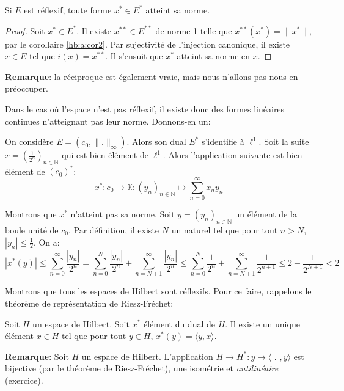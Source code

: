 \begin{prop}
  Si $E$ est réflexif, toute forme $x^*\in E^*$ atteint
  sa norme.
\end{prop}

\begin{proof}
  Soit $x^*\in E^*$. Il existe $x^{**}\in E^{**}$ de
  norme 1
  telle que $x^{**}(x^*)=\|x^*\|$, par le corollaire
  \ref{hb:a:cor2}. Par sujectivité de l'injection
  canonique, il existe $x\in E$ tel que $i(x)=x^{**}$.
  Il s'ensuit que $x^*$ atteint sa norme en $x$.
\end{proof}

\textbf{Remarque}: la réciproque est également vraie,
mais nous n'allons pas nous en préoccuper.

Dans le cas où l'espace n'est pas réflexif, il
existe donc des formes linéaires continues n'atteignant
pas leur norme. Donnons-en un:
\begin{ex}
  On considère $E = (c_0, \|.\|_\infty)$. Alors
  son dual $E^*$ s'identifie à $\ell^1$. Soit
  la suite $x = (\frac{1}{2^n})_{n\in \mathbb{N}}$
  qui est bien élément de $\ell^1$. Alors
  l'application suivante est bien élément de $(c_0)^*$:
  $$x^*:c_0\to\mathbb{K}:(y_n)_{n\in\mathbb{N}}\mapsto \sum_{n=0}^\infty x_ny_n$$

  Montrons que $x^*$ n'atteint pas sa norme. Soit $y = (y_n)_{n\in\mathbb{N}}$
  un élément de la boule unité de $c_0$. Par définition, il existe
  $N$ un naturel tel que pour tout $n > N$, $|y_n|\leq \frac{1}{2}$. On a:
  $$|x^*(y)| \leq \sum_{n=0}^\infty \frac{|y_n|}{2^n} =
  \sum_{n=0}^{N} \frac{|y_n|}{2^n} + \sum_{n=N+1}^\infty \frac{|y_n|}{2^n}
  \leq \sum_{n=0}^{N} \frac{1}{2^n} + \sum_{n=N+1}^\infty \frac{1}{2^{n+1}}
  \leq 2 - \frac{1}{2^{N+1}}<2$$
\end{ex}

Montrons que tous les espaces de Hilbert sont réflexifs.
Pour ce faire, rappelons le théorème de représentation
de Riesz-Fréchet:
\begin{thm}
  Soit $H$ un espace de Hilbert. Soit $x^*$ élément du dual de $H$.
  Il existe un unique élément $x\in H$ tel que pour tout $y\in H$,
  $x^*(y) = \langle y, x\rangle$.
\end{thm}

\textbf{Remarque}: Soit $H$ un espace de Hilbert.
L'application $H\to H^*: y \mapsto \langle$ $.$ $, y\rangle$ est
bijective (par le théorème de Riesz-Fréchet), une isométrie
et \emph{antilinéaire} (exercice).

